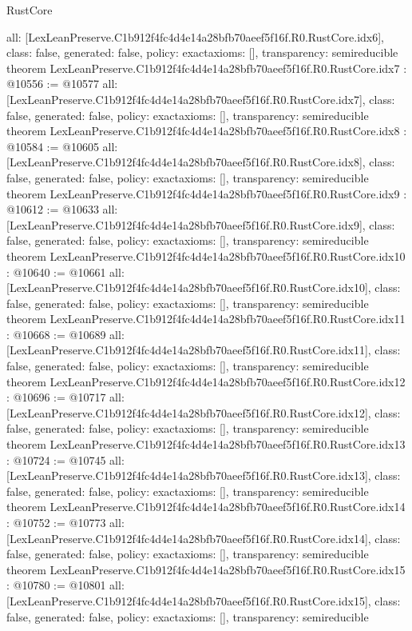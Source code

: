 \begin{lexlean}{RustCore}
\begin{coremodule}
{  all: [LexLeanPreserve.C1b912f4fc4d4e14a28bfb70aeef5f16f.R0.RustCore.idx6],
  class: false,
  generated: false,
  policy: exact{axioms: []},
  transparency: semireducible
}
theorem LexLeanPreserve.C1b912f4fc4d4e14a28bfb70aeef5f16f.R0.RustCore.idx7 : @10556 := @10577 {
  all: [LexLeanPreserve.C1b912f4fc4d4e14a28bfb70aeef5f16f.R0.RustCore.idx7],
  class: false,
  generated: false,
  policy: exact{axioms: []},
  transparency: semireducible
}
theorem LexLeanPreserve.C1b912f4fc4d4e14a28bfb70aeef5f16f.R0.RustCore.idx8 : @10584 := @10605 {
  all: [LexLeanPreserve.C1b912f4fc4d4e14a28bfb70aeef5f16f.R0.RustCore.idx8],
  class: false,
  generated: false,
  policy: exact{axioms: []},
  transparency: semireducible
}
theorem LexLeanPreserve.C1b912f4fc4d4e14a28bfb70aeef5f16f.R0.RustCore.idx9 : @10612 := @10633 {
  all: [LexLeanPreserve.C1b912f4fc4d4e14a28bfb70aeef5f16f.R0.RustCore.idx9],
  class: false,
  generated: false,
  policy: exact{axioms: []},
  transparency: semireducible
}
theorem LexLeanPreserve.C1b912f4fc4d4e14a28bfb70aeef5f16f.R0.RustCore.idx10 : @10640 := @10661 {
  all: [LexLeanPreserve.C1b912f4fc4d4e14a28bfb70aeef5f16f.R0.RustCore.idx10],
  class: false,
  generated: false,
  policy: exact{axioms: []},
  transparency: semireducible
}
theorem LexLeanPreserve.C1b912f4fc4d4e14a28bfb70aeef5f16f.R0.RustCore.idx11 : @10668 := @10689 {
  all: [LexLeanPreserve.C1b912f4fc4d4e14a28bfb70aeef5f16f.R0.RustCore.idx11],
  class: false,
  generated: false,
  policy: exact{axioms: []},
  transparency: semireducible
}
theorem LexLeanPreserve.C1b912f4fc4d4e14a28bfb70aeef5f16f.R0.RustCore.idx12 : @10696 := @10717 {
  all: [LexLeanPreserve.C1b912f4fc4d4e14a28bfb70aeef5f16f.R0.RustCore.idx12],
  class: false,
  generated: false,
  policy: exact{axioms: []},
  transparency: semireducible
}
theorem LexLeanPreserve.C1b912f4fc4d4e14a28bfb70aeef5f16f.R0.RustCore.idx13 : @10724 := @10745 {
  all: [LexLeanPreserve.C1b912f4fc4d4e14a28bfb70aeef5f16f.R0.RustCore.idx13],
  class: false,
  generated: false,
  policy: exact{axioms: []},
  transparency: semireducible
}
theorem LexLeanPreserve.C1b912f4fc4d4e14a28bfb70aeef5f16f.R0.RustCore.idx14 : @10752 := @10773 {
  all: [LexLeanPreserve.C1b912f4fc4d4e14a28bfb70aeef5f16f.R0.RustCore.idx14],
  class: false,
  generated: false,
  policy: exact{axioms: []},
  transparency: semireducible
}
theorem LexLeanPreserve.C1b912f4fc4d4e14a28bfb70aeef5f16f.R0.RustCore.idx15 : @10780 := @10801 {
  all: [LexLeanPreserve.C1b912f4fc4d4e14a28bfb70aeef5f16f.R0.RustCore.idx15],
  class: false,
  generated: false,
  policy: exact{axioms: []},
  transparency: semireducible
}
\end{coremodule}
\end{lexlean}
